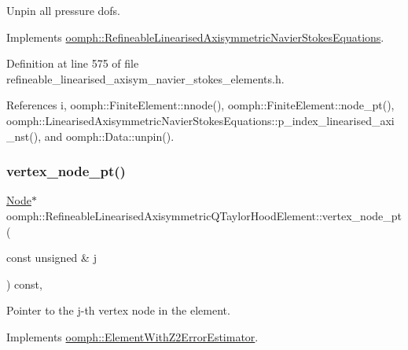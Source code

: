 Unpin all pressure dofs. 



Implements \hyperlink{classoomph_1_1RefineableLinearisedAxisymmetricNavierStokesEquations_a7a0d635c46d7faabe63c432b3435455d}{oomph\+::\+Refineable\+Linearised\+Axisymmetric\+Navier\+Stokes\+Equations}.



Definition at line 575 of file refineable\+\_\+linearised\+\_\+axisym\+\_\+navier\+\_\+stokes\+\_\+elements.\+h.



References i, oomph\+::\+Finite\+Element\+::nnode(), oomph\+::\+Finite\+Element\+::node\+\_\+pt(), oomph\+::\+Linearised\+Axisymmetric\+Navier\+Stokes\+Equations\+::p\+\_\+index\+\_\+linearised\+\_\+axi\+\_\+nst(), and oomph\+::\+Data\+::unpin().

\mbox{\label{classoomph_1_1RefineableLinearisedAxisymmetricQTaylorHoodElement_a33924a0fb1d9620734a845545b27c7be}} 
\subsubsection{\texorpdfstring{vertex\+\_\+node\+\_\+pt()}{vertex\_node\_pt()}}
{\footnotesize\ttfamily \hyperlink{classoomph_1_1Node}{Node}$\ast$ oomph\+::\+Refineable\+Linearised\+Axisymmetric\+Q\+Taylor\+Hood\+Element\+::vertex\+\_\+node\+\_\+pt (\begin{DoxyParamCaption}\item[{const unsigned \&}]{j }\end{DoxyParamCaption}) const\hspace{0.3cm}{\ttfamily [inline]}, {\ttfamily [virtual]}}



Pointer to the j-\/th vertex node in the element. 



Implements \hyperlink{classoomph_1_1ElementWithZ2ErrorEstimator_a0eedccc33519f852c5dc2055ddf2774b}{oomph\+::\+Element\+With\+Z2\+Error\+Estimator}.




